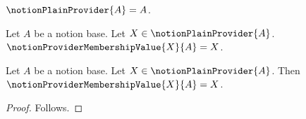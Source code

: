 

\begin{definition}\label{notion_plain_provider}
    $\notionPlainProvider{A}=A$.
\end{definition}

\begin{definition}\label{notion_provider_membership_value}
    Let $A$ be a notion base.
    Let $X\in\notionPlainProvider{A}$.
    $\notionProviderMembershipValue{X}{A}=X$.
\end{definition}

\begin{proposition}\label{notion_provider_membership_value_elim}
    Let $A$ be a notion base.
    Let $X\in\notionPlainProvider{A}$.
    Then $\notionProviderMembershipValue{X}{A}=X$.
\end{proposition}
\begin{proof}
    Follows.
\end{proof}
